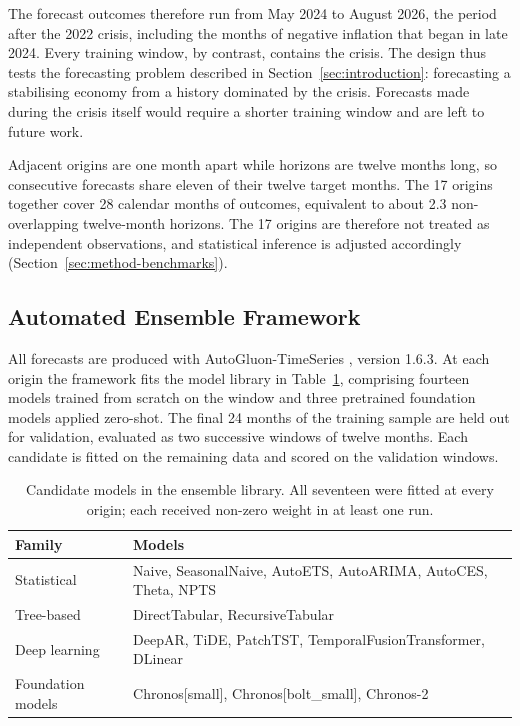 \documentclass[12pt]{article}
\begin{document}
The forecast outcomes therefore run from May 2024 to August 2026, the period
after the 2022 crisis, including the months of negative inflation that began
in late 2024. Every training window, by contrast, contains the crisis. The
design thus tests the forecasting problem described in
Section~\ref{sec:introduction}: forecasting a stabilising economy from a
history dominated by the crisis. Forecasts made during the crisis itself would
require a shorter training window and are left to future work.

Adjacent origins are one month apart while horizons are twelve months long,
so consecutive forecasts share eleven of their twelve target months. The 17
origins together cover 28 calendar months of outcomes, equivalent to about
2.3 non-overlapping twelve-month horizons. The 17 origins are therefore not
treated as independent observations, and statistical inference is adjusted
accordingly (Section~\ref{sec:method-benchmarks}).

\subsection{Automated Ensemble Framework}
\label{sec:method-framework}

All forecasts are produced with AutoGluon-TimeSeries
\citep{shchur2023autogluon}, version 1.6.3. At each origin the framework fits
the model library in Table~\ref{tab:models}, comprising fourteen models trained
from scratch on the window and three pretrained foundation models applied
zero-shot. The final 24 months of the training sample are held out for
validation, evaluated as two successive windows of twelve months. Each
candidate is fitted on the remaining data and scored on the validation windows.

\begin{table}[htbp]
\centering
\caption{Candidate models in the ensemble library. All seventeen were fitted at
every origin; each received non-zero weight in at least one run.}
\label{tab:models}
\begin{tabular}{ll}
\toprule
Family & Models \\
\midrule
Statistical       & Naive, SeasonalNaive, AutoETS, AutoARIMA, AutoCES, Theta, NPTS \\
Tree-based        & DirectTabular, RecursiveTabular \\
Deep learning     & DeepAR, TiDE, PatchTST, TemporalFusionTransformer, DLinear \\
Foundation models & Chronos[small], Chronos[bolt\_small], Chronos-2 \\
\bottomrule
\end{tabular}
\end{table}
\end{document}
